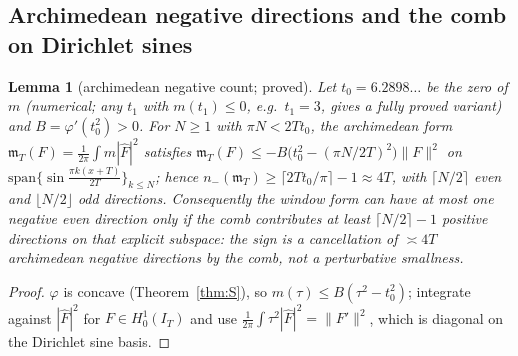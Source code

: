 \documentclass[11pt]{amsart}
\newtheorem{lemma}[theorem]{Lemma}
\theoremstyle{definition}
\theoremstyle{remark}
\begin{document}
\subsection{Archimedean negative directions and the comb on Dirichlet sines}\label{subsec:even-count}

\begin{lemma}[archimedean negative count; proved]\label{lem:archcount}
Let $t_0=6.2898\ldots$ be the zero of $m$ (numerical; any $t_1$ with $m(t_1)\le0$, e.g.\ $t_1=3$, gives a fully proved
variant) and $B=\varphi'(t_0^2)>0$. For $N\ge1$ with $\pi N<2Tt_0$, the archimedean form
$\mathfrak m_T(F)=\frac1{2\pi}\int m|\widehat F|^2$ satisfies $\mathfrak m_T(F)\le-B\big(t_0^2-(\pi N/2T)^2\big)\|F\|^2$ on
$\mathrm{span}\{\sin\frac{\pi k(x+T)}{2T}\}_{k\le N}$; hence $n_-(\mathfrak m_T)\ge\lceil 2Tt_0/\pi\rceil-1\approx4T$, with
$\lceil N/2\rceil$ even and $\lfloor N/2\rfloor$ odd directions. Consequently the window form can have at most one negative
even direction only if the comb contributes at least $\lceil N/2\rceil-1$ positive directions on that explicit subspace:
the sign is a cancellation of $\asymp 4T$ archimedean negative directions by the comb, not a perturbative smallness.
\end{lemma}
\begin{proof}
$\varphi$ is concave (Theorem~\ref{thm:S}), so $m(\tau)\le B(\tau^2-t_0^2)$; integrate against $|\widehat F|^2$ for
$F\in H^1_0(I_T)$ and use $\frac1{2\pi}\int\tau^2|\widehat F|^2=\|F'\|^2$, which is diagonal on the Dirichlet sine basis.
\end{proof}
\end{document}
